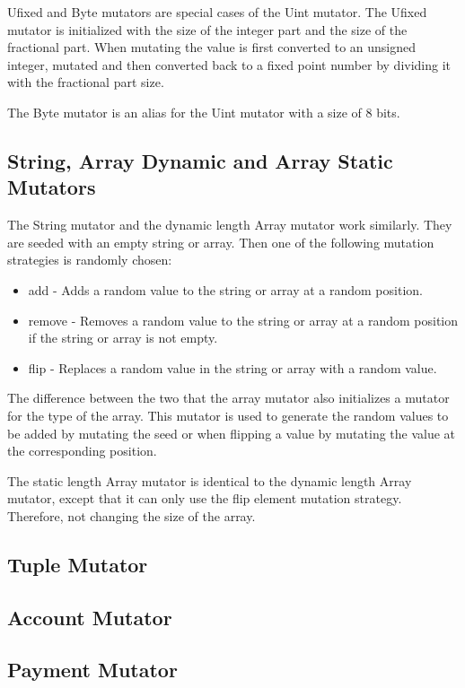 Ufixed and Byte mutators are special cases of the Uint mutator. The Ufixed mutator is initialized with the size of the integer part and the size of the fractional part. When mutating the value is first converted to an unsigned integer, mutated and then converted back to a fixed point number by dividing it with the fractional part size.

The Byte mutator is an alias for the Uint mutator with a size of 8 bits.

\subsection*{String, Array Dynamic and Array Static Mutators}
The String mutator and the dynamic length Array mutator work similarly. They are seeded with an empty string or array. Then one of the following mutation strategies is randomly chosen:
\begin{itemize}
    \item add - Adds a random value to the string or array at a random position.
    \item remove - Removes a random value to the string or array at a random position if the string or array is not empty.
    \item flip - Replaces a random value in the string or array with a random value.
\end{itemize}

The difference between the two that the array mutator also initializes a mutator for the type of the array.
This mutator is used to generate the random values to be added by mutating the seed or when flipping a value by mutating the value at the corresponding position.

The static length Array mutator is identical to the dynamic length Array mutator, except that it can only use the flip element mutation strategy.
Therefore, not changing the size of the array.

\subsection*{Tuple Mutator}

\subsection*{Account Mutator}

\subsection*{Payment Mutator}

